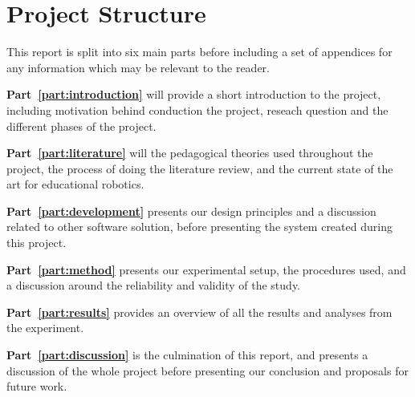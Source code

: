 \section{Project Structure}
This report is split into six main parts before including a set of appendices for any information which may be relevant to the reader.

\bigskip\noindent
\textbf{Part~\ref{part:introduction}} will provide a short introduction to the project, including motivation behind conduction the project, reseach question and the different phases of the project.

\bigskip\noindent
\textbf{Part~\ref{part:literature}} will the pedagogical theories used throughout the project, the process of doing the literature review, and the current state of the art for educational robotics. 

\bigskip\noindent
\textbf{Part~\ref{part:development}} presents our design principles and a discussion related to other software solution, before presenting the system created during this project. 

\bigskip\noindent
\textbf{Part~\ref{part:method}} presents our experimental setup, the procedures used, and a discussion around the reliability and validity of the study.

\bigskip\noindent
\textbf{Part~\ref{part:results}} provides an overview of all the results and analyses from the experiment.

\bigskip\noindent
\textbf{Part~\ref{part:discussion}} is the culmination of this report, and presents a discussion of the whole project before presenting our conclusion and proposals for future work. 

